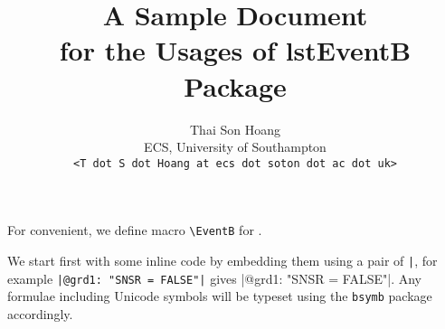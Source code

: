 \usepackage{verbatim}
\usepackage{mdframed}
\title{A Sample Document\\for the Usages of \textsf{lstEventB} Package}
\author{Thai Son Hoang\\ECS, University of Southampton\\\texttt{<T dot S dot Hoang at ecs dot soton dot ac dot uk>}}


\maketitle
For convenient, we define macro \verb|\EventB| for \EventB. 

We start first with some inline \EventB code by embedding them using a pair of \verb$|$, for example \verb$|@grd1: "SNSR = FALSE"|$ gives |@grd1: "SNSR = FALSE"|. Any \EventB formulae including Unicode symbols will be typeset using the \verb|bsymb| package accordingly.

